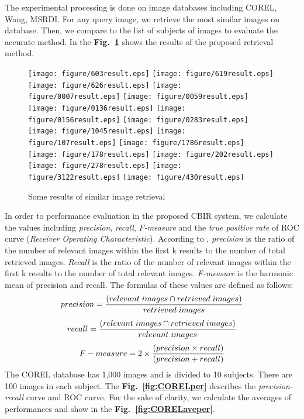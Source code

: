 \documentclass{amcs}
\begin{document}
The experimental processing is done on image databases including COREL, Wang, MSRDI. For any query image, we retrieve the most similar images on database. Then, we compare to the list of subjects of images to evaluate the accurate method. In the \textbf{Fig.~\ref{res-query}} shows the results of the proposed retrieval method.

\begin{figure}[!ht]
	\centering
		\texttt{[image: figure/603result.eps]}
		\texttt{[image: figure/619result.eps]}
		\texttt{[image: figure/626result.eps]}
		\texttt{[image: figure/0007result.eps]}
		\texttt{[image: figure/0059result.eps]}
		\texttt{[image: figure/0136result.eps]}
		\texttt{[image: figure/0156result.eps]}
		\texttt{[image: figure/0283result.eps]}
		\texttt{[image: figure/1045result.eps]}
		\texttt{[image: figure/107result.eps]}
		\texttt{[image: figure/1786result.eps]}
		\texttt{[image: figure/178result.eps]}
		\texttt{[image: figure/202result.eps]}
		\texttt{[image: figure/278result.eps]}
		\texttt{[image: figure/3122result.eps]}
		\texttt{[image: figure/430result.eps]}
		\caption{Some results of similar image retrieval}
		\label{res-query}
\end{figure}
In order to performance evaluation in the proposed CBIR system, we calculate the values including \textit{precision}, \textit{recall}, \textit{F-measure} and the \textit{true positive rate} of ROC curve (\textit{Receiver Operating Characteristic}). According to \cite{Ahmad:15}, \textit{precision} is the ratio of the number of relevant images within the first k results to the number of total retrieved images. \textit{Recall} is the ratio of the number of relevant images within the first k results to the number of total relevant images. \textit{F-measure} is the harmonic mean of precision and recall. The formulas of these values are defined as follows:
\begin{equation}
\footnotesize precision = \frac{{(relevant~images \cap retrieved~images)}}{{retrieved~images}}
\end{equation}
\begin{equation}
\footnotesize recall = \frac{{(relevant~images \cap retrieved~images)}}{{relevant~images}}
\end{equation}
\begin{equation}
\footnotesize F - measure = 2 \times \frac{{(precision \times recall)}}{{(precision + recall)}}
\end{equation}
The COREL database has 1,000 images and is divided to 10 subjects. There are 100 images in each subject. The \textbf{Fig.~\ref{fig:CORELper}}  describes the \textit{precision-recall} curve and ROC curve. For the sake of clarity, we calculate the averages of performances and show in the \textbf{Fig.~\ref{fig:CORELaveper}}.
\end{document}
